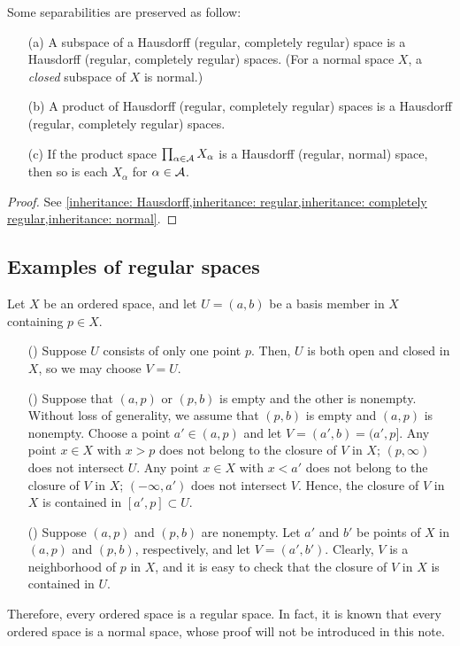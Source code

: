 \begin{prop}\label{inheritance of separabilities}
    Some separabilities are preserved as follow:
    \begin{enumerate}
        \item[(a)]
        {
            A subspace of a Hausdorff (regular, completely regular) space is a Hausdorff (regular, completely regular) spaces.
            (For a normal space $X$, a \textit{closed} subspace of $X$ is normal.)
        }
        \item[(b)]
        {
            A product of Hausdorff (regular, completely regular) spaces is a Hausdorff (regular, completely regular) spaces.
        }
        \item[(c)]
        {
            If the product space $\prod_{\alpha\in {\mathcal{A}}} X_\alpha$ is a Hausdorff (regular, normal) space, then so is each $X_\alpha$ for $\alpha\in {\mathcal{A}}$.
        }
    \end{enumerate}
\end{prop}
\begin{proof}
    See \cref{inheritance: Hausdorff,inheritance: regular,inheritance: completely regular,inheritance: normal}.
\end{proof}

\subsection{Examples of regular spaces}
\begin{exmp}
    Let $X$ be an ordered space, and let $U=(a, b)$ be a basis member in $X$ containing $p\in X$.
    \begin{enumerate}
        \item[(\romannumeral 1)]
        {
            Suppose $U$ consists of only one point $p$.
            Then, $U$ is both open and closed in $X$, so we may choose $V=U$.
        }
        \item[(\romannumeral 2)]
        {
            Suppose that $(a, p)$ or $(p, b)$ is empty and the other is nonempty.
            Without loss of generality, we assume that $(p, b)$ is empty and $(a, p)$ is nonempty.
            Choose a point $a'\in(a, p)$ and let $V=(a', b)=(a', p]$.
            Any point $x\in X$ with $x>p$ does not belong to the closure of $V$ in $X$; $(p, \infty)$ does not intersect $U$.
            Any point $x\in X$ with $x<a'$ does not belong to the closure of $V$ in $X$; $(-\infty, a')$ does not intersect $V$.
            Hence, the closure of $V$ in $X$ is contained in $[a', p]\subset U$.
        }
        \item[(\romannumeral 3)]
        {
            Suppose $(a, p)$ and $(p, b)$ are nonempty.
            Let $a'$ and $b'$ be points of $X$ in $(a, p)$ and $(p, b)$, respectively, and let $V=(a', b')$.
            Clearly, $V$ is a neighborhood of $p$ in $X$, and it is easy to check that the closure of $V$ in $X$ is contained in $U$.
        }
    \end{enumerate}
    Therefore, every ordered space is a regular space.
    In fact, it is known that every ordered space is a normal space, whose proof will not be introduced in this note.
\end{exmp}

